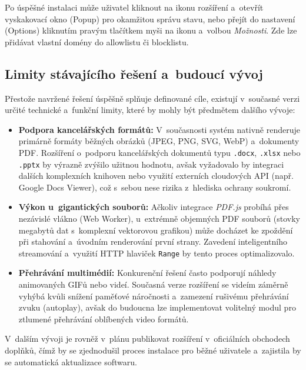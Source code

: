 \documentclass[a4paper,12pt]{article}
\begin{document}
Po úspěšné instalaci může uživatel kliknout na ikonu rozšíření a~otevřít vyskakovací okno (Popup) pro okamžitou správu stavu, nebo přejít do nastavení (Options) kliknutím pravým tlačítkem myši na ikonu a~volbou \textit{Možnosti}. Zde lze přidávat vlastní domény do allowlistu či blocklistu.

\subsection{Limity stávajícího řešení a~budoucí vývoj}
\label{subsec:praxe_limity}

Přestože navržené řešení úspěšně splňuje definované cíle, existují v~současné verzi určité technické a~funkční limity, které by mohly být předmětem dalšího vývoje:

\begin{itemize}
    \item \textbf{Podpora kancelářských formátů:} V~současnosti systém nativně renderuje primárně formáty běžných obrázků (JPEG, PNG, SVG, WebP) a~dokumenty PDF. Rozšíření o~podporu kancelářských dokumentů typu \texttt{.docx}, \texttt{.xlsx} nebo \texttt{.pptx} by výrazně zvýšilo užitnou hodnotu, avšak vyžadovalo by integraci dalších komplexních knihoven nebo využití externích cloudových API (např. Google Docs Viewer), což s~sebou nese rizika z~hlediska ochrany soukromí.
    \item \textbf{Výkon u~gigantických souborů:} Ačkoliv integrace \textit{PDF.js} probíhá přes nezávislé vlákno (Web Worker), u~extrémně objemných PDF souborů (stovky megabytů dat s~komplexní vektorovou grafikou) může docházet ke zpoždění při stahování a~úvodním renderování první strany. Zavedení inteligentního streamování a~využití HTTP hlaviček \texttt{Range} by tento proces optimalizovalo.
    \item \textbf{Přehrávání multimédií:} Konkurenční řešení často podporují náhledy animovaných GIFů nebo videí. Současná verze rozšíření se videím záměrně vyhýbá kvůli snížení paměťové náročnosti a~zamezení rušivému přehrávání zvuku (autoplay), avšak do budoucna lze implementovat volitelný modul pro ztlumené přehrávání oblíbených video formátů.
\end{itemize}

V~dalším vývoji je rovněž v~plánu publikovat rozšíření v~oficiálních obchodech doplňků, čímž by se zjednodušil proces instalace pro běžné uživatele a~zajistila by se automatická aktualizace softwaru.

\end{document}
